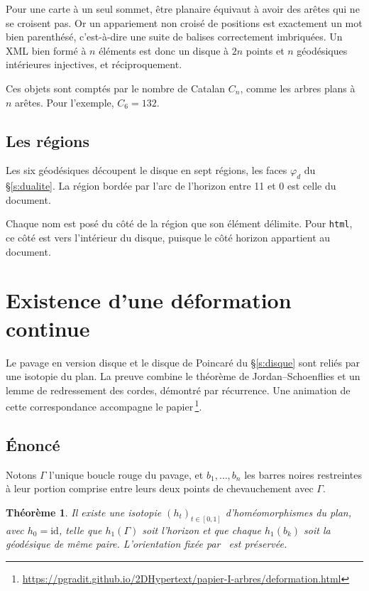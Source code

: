 \documentclass[11pt,a4paper]{article}
\newtheorem{theoreme}{Théorème}
\theoremstyle{remark}
\newcommand{\urlanimation}{https://pgradit.github.io/2DHypertext/papier-I-arbres/deformation.html}
\newcommand{\balise}[1]{\texttt{#1}}
\begin{document}
Pour une carte à un seul sommet, être planaire équivaut à avoir des arêtes qui ne
se croisent pas. Or un appariement non croisé de positions est exactement un mot
bien parenthésé, c'est-à-dire une suite de balises correctement imbriquées. Un
XML bien formé à $n$ éléments est donc un disque à $2n$ points et $n$ géodésiques
intérieures injectives, et réciproquement.

Ces objets sont comptés par le nombre de Catalan $C_n$, comme les arbres plans à
$n$ arêtes. Pour l'exemple, $C_6=132$.

\subsection{Les régions}

Les six géodésiques découpent le disque en sept régions, les faces $\varphi_d$
du §\ref{s:dualite}. La région bordée par l'arc de l'horizon entre 11 et 0 est
celle du document.

Chaque nom est posé du côté de la région que son élément délimite. Pour
\balise{html}, ce côté est vers l'intérieur du disque, puisque le côté horizon
appartient au document.

\section{Existence d'une déformation continue}\label{s:deformation}

Le pavage en version disque et le disque de Poincaré du §\ref{s:disque} sont
reliés par une isotopie du plan. La preuve combine le théorème de
Jordan--Schoenflies et un lemme de redressement des cordes, démontré par
récurrence. Une animation de cette correspondance accompagne le
papier\,\footnote{\url{\urlanimation}}.

\subsection{Énoncé}

Notons $\Gamma$ l'unique boucle rouge du pavage, et $b_1,\dots,b_n$ les barres
noires restreintes à leur portion comprise entre leurs deux points de
chevauchement avec $\Gamma$.

\begin{theoreme}\label{t:deformation}
Il existe une isotopie $(h_t)_{t\in[0,1]}$ d'homéomorphismes du plan, avec
$h_0=\mathrm{id}$, telle que $h_1(\Gamma)$ soit l'horizon et que chaque
$h_1(b_k)$ soit la géodésique de même paire. L'orientation fixée par \spin\ est
préservée.
\end{theoreme}
\end{document}
